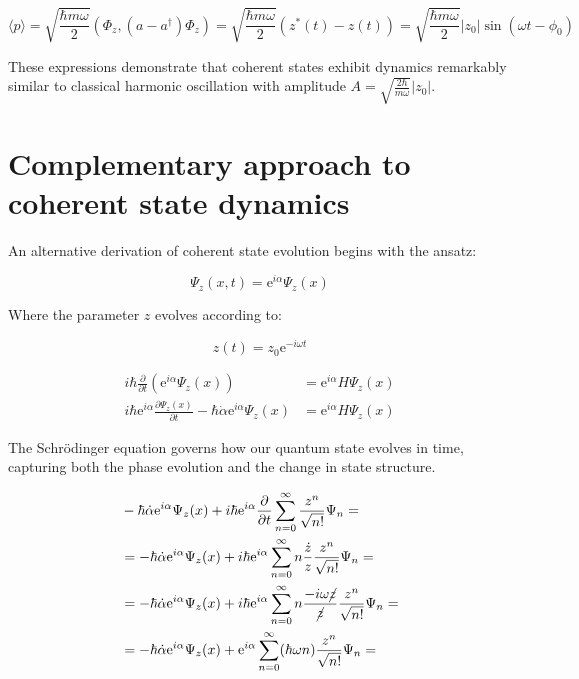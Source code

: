 \begin{equation}
\langle p\rangle=\sqrt{\frac{\hbar m \omega}{2}}\left(\Phi_{z},\left(a-a^{\dagger}\right) \Phi_{z}\right)=\sqrt{\frac{\hbar m \omega}{2}}\left(z^{*}(t)-z(t)\right)=\sqrt{\frac{\hbar m \omega}{2}}\left|z_{0}\right| \sin \left(\omega t-\phi_{0}\right)
\end{equation}

These expressions demonstrate that coherent states exhibit dynamics remarkably similar to classical harmonic oscillation with amplitude $A=\sqrt{\frac{2 \hbar}{m \omega}}\left|z_{0}\right|$.

\section{Complementary approach to coherent state dynamics}
An alternative derivation of coherent state evolution begins with the ansatz:

\begin{equation}
\Psi_{z}(x, t)=\mathrm{e}^{i \alpha} \Psi_{z}(x)
\end{equation}

Where the parameter $z$ evolves according to:

\begin{equation}
z(t)=z_{0} \mathrm{e}^{-i \omega t}
\end{equation}

\begin{align}
i \hbar \frac{\partial}{\partial t}\left(\mathrm{e}^{i \alpha} \Psi_{z}(x)\right) & =\mathrm{e}^{i \alpha} H \Psi_{z}(x) \\
i \hbar \mathrm{e}^{i \alpha} \frac{\partial \Psi_{z}(x)}{\partial t}-\hbar \dot{\alpha} \mathrm{e}^{i \alpha} \Psi_{z}(x) & =\mathrm{e}^{i \alpha} H \Psi_{z}(x)
\end{align}

The Schrödinger equation governs how our quantum state evolves in time, capturing both the phase evolution and the change in state structure.

\begin{align}
& -\hbar \dot{\alpha} \mathrm{e}^{i \alpha} \Psi_{z}(x)+i \hbar \mathrm{e}^{i \alpha} \frac{\partial}{\partial t} \sum_{n=0}^{\infty} \frac{z^{n}}{\sqrt{n!}} \Psi_{n}= \\
& =-\hbar \dot{\alpha} \mathrm{e}^{i \alpha} \Psi_{z}(x)+i \hbar \mathrm{e}^{i \alpha} \sum_{n=0}^{\infty} n \frac{\dot{z}}{z} \frac{z^{n}}{\sqrt{n!}} \Psi_{n}= \\
& =-\hbar \dot{\alpha} \mathrm{e}^{i \alpha} \Psi_{z}(x)+i \hbar \mathrm{e}^{i \alpha} \sum_{n=0}^{\infty} n \frac{-i \omega \cancel{z}}{\cancel{z}} \frac{z^{n}}{\sqrt{n!}} \Psi_{n}=  \\
& =-\hbar \dot{\alpha} \mathrm{e}^{i \alpha} \Psi_{z}(x)+\mathrm{e}^{i \alpha} \sum_{n=0}^{\infty}(\hbar \omega n) \frac{z^{n}}{\sqrt{n!}} \Psi_{n}=
\end{align}

